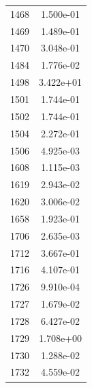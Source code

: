 \documentclass[12pt]{article}
\begin{document}
\begin{longtable}{@{}cc@{}}
1468 & 1.500e-01 \\
1469 & 1.489e-01 \\
1470 & 3.048e-01 \\
1484 & 1.776e-02 \\
1498 & 3.422e+01 \\
1501 & 1.744e-01 \\
1502 & 1.744e-01 \\
1504 & 2.272e-01 \\
1506 & 4.925e-03 \\
1608 & 1.115e-03 \\
1619 & 2.943e-02 \\
1620 & 3.006e-02 \\
1658 & 1.923e-01 \\
1706 & 2.635e-03 \\
1712 & 3.667e-01 \\
1716 & 4.107e-01 \\
1726 & 9.910e-04 \\
1727 & 1.679e-02 \\
1728 & 6.427e-02 \\
1729 & 1.708e+00 \\
1730 & 1.288e-02 \\
1732 & 4.559e-02 \\

\bottomrule
\end{longtable}
\end{document}
